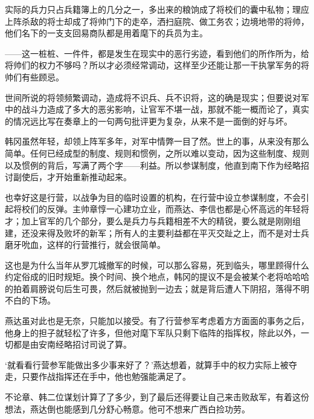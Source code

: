 实际的兵力只占兵籍簿上的几分之一，多出来的粮饷成了将校们的囊中私物；理应上阵杀敌的将士却成了将帅门下的走卒，洒扫庭院、做工务农；边境地带的将帅，他们名下的一支支回易商队都是用着麾下的兵员为主。

——这一桩桩、一件件，都是发生在现实中的恶行劣迹，看到他们的所作所为，给将帅们的权力不够吗？所以才必须经常调动，这样至少还能让那一干执掌军务的将帅们有些顾忌。

世间所说的将领频繁调动，造成将不识兵、兵不识将，这的确是现实；但要说对军中的战斗力造成了多大的恶劣影响，让官军不堪一战，那就不能一概而论了，真实的情况远比写在奏章上的一句两句批评更为复杂，从来不是一面倒的好与坏。

韩冈虽然年轻，却领上阵军多年，对军中情弊一目了然。世上的事，从来没有那么简单。任何已经成型的制度、规则和惯例，之所以难以变动，因为这些制度、规则以及惯例的背后，写满了两个字——利益。所以参谋制度，他直到南下作为经略招讨副使后，才开始重新推动起来。

也幸好这是行营，以战争为目的临时设置的机构，在行营中设立参谋制度，不会引起将校们的反弹。主帅章惇一心建功立业，而燕达、李信也都是心怀高远的年轻将才；加上官军的几个部分，要么是兵力与兵籍相差不大的精锐，要么就是刚刚组建，还没来得及败坏的新军；所有人的主要利益都在平灭交趾之上，而不是对士兵磨牙吮血，这样的行营推行，就会很简单。

这也是为什么当年从罗兀城撤军的时候，可以那么容易，死到临头，哪里顾得什么约定俗成的旧时规矩。换个时间、换个地点，韩冈的提议不是会被某个老将哈哈哈的拍着肩膀说句后生可畏，然后就被抛到一边去；就是背后遭人下阴招，落得不明不白的下场。

燕达虽对此也是无奈，只能加以接受。有了行营参军考虑着方方面面的事务之后，他身上的担子就轻松了许多，但他对麾下军队只剩下临阵的指挥权，除此以外，一切都是由安南经略招讨司说了算。

‘就看看行营参军能做出多少事来好了？’燕达想着，就算手中的权力实际上被夺走，只要作战指挥还在手中，他也勉强能满足了。

不论章、韩二位谋划计算了了多少，到了最后还得要让自己来击败敌军，有着这份想法，燕达倒也能感到几分舒心畅意。他可不想来广西白捡功劳。

